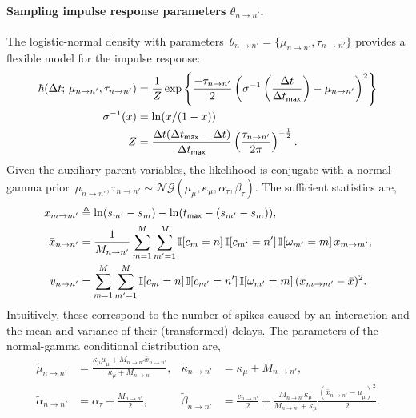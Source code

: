\paragraph{Sampling impulse response parameters $\theta_{n \to n'}$.}
The logistic-normal density with parameters~${\theta_{n \to
    n'}=\{\mu_{n \to n'},\tau_{n \to n'}\}}$ provides a flexible model
for the impulse response:
\begin{align*}
  \hbar(\Delta t ; \,  \mu_{n \to n'}, \tau_{n \to n'})
  &=\frac{1}{Z}\exp\left\{\frac{-\tau_{n \to n'}}{2}
  \left(\sigma^{-1}\left(\frac{\Delta t}{\Delta t_{\mathsf{max}}}\right)
  - \mu_{n \to n'} \right)^2 \right\} \\
  \sigma^{-1}(x) &= \ln(x/(1-x))\\ Z &=
  \frac{\Delta t(\Delta t_{\sf{max}}-\Delta t)}{\Delta t_{\mathsf{max}}}
  \left(\frac{\tau_{n \to n'}}{2\pi}\right)^{-\frac{1}{2}}.
\end{align*}
Given the auxiliary parent variables, the likelihood is conjugate with
a normal-gamma prior~${\mu_{n \to n'},\tau_{n \to n'} \sim
  \mathcal{NG}(\mu_\mu,\kappa_\mu,\alpha_\tau,\beta_\tau)}$.
The sufficient statistics are,
\begin{align*}
x_{m \to m'} &\triangleq \ln(s_{m'}-s_m)-\ln(t_{\sf{max}}-(s_{m'}-s_m)), \\
\bar{x}_{n \to n'} &= \frac{1}{M_{n \to n'}} \sum_{m=1}^M \sum_{m'=1}^M \mathbb{I}[c_m=n] \, \mathbb{I}[c_{m'}=n'] \, \mathbb{I}[\omega_{m'}=m] \,x_{m \to m'}, \\
v_{n \to n'} &= \sum_{m=1}^M \sum_{m'=1}^M \mathbb{I}[c_m=n] \, \mathbb{I}[c_{m'}=n'] \, \mathbb{I}[\omega_{m'}=m] \, (x_{m \to m'} - \bar{x})^2.
\end{align*}
Intuitively, these correspond to the number of spikes caused by an
interaction and the mean and variance of their (transformed) delays.
The parameters of the normal-gamma conditional distribution are,
\begin{align*}
  \widetilde{\mu}_{n \to n'} &= \frac{\kappa_\mu \mu_\mu + M_{n \to n'} \bar{x}_{n \to n'}}{\kappa_\mu + M_{n \to n'}}, 
  &
  \widetilde{\kappa}_{n \to n'} &= \kappa_\mu + M_{n \to n'}, \\
  \widetilde{\alpha}_{n \to n'} &= \alpha_{\tau} + \frac{M_{n \to n'}}{2},
  & 
  \widetilde{\beta}_{n \to n'} &= \frac{v_{n \to n'}}{2} + \frac{M_{n \to n'} \kappa_\mu}{M_{n \to n'} + \kappa_\mu}\frac{(\bar{x}_{n \to n'} - \mu_\mu)^2}{2}.
\end{align*}

